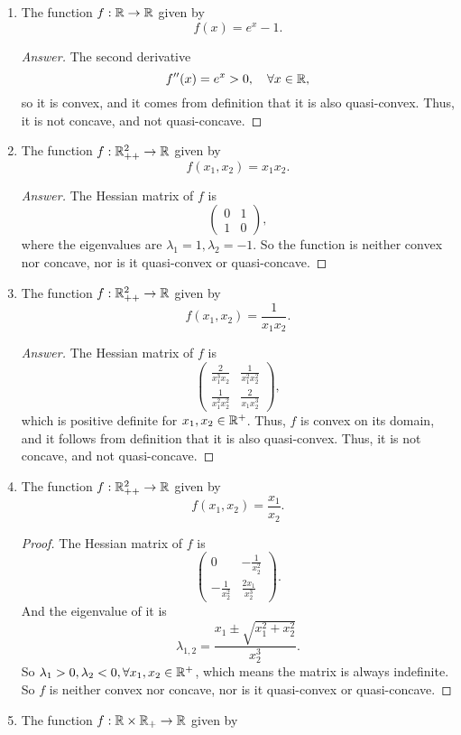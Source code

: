 \begin{enumerate}
	\item The function \(f: \mathbb{R} \to \mathbb{R}\) given by
	\[ f(x)=e^x-1. \]
	\begin{proof}[Answer]
	The second derivative
	\[ f''(x)=e^x>0,\quad \forall x\in\mathbb{R}, \]
	so it is convex, and it comes from definition that it is also quasi-convex.
	Thus, it is not concave, and not quasi-concave.
	\end{proof}
	\item The function \(f: \mathbb{R}_{++}^2 \to \mathbb{R}\) given by
	\[ f(x_1,x_2)=x_1 x_2. \]
	\begin{proof}[Answer]
	The Hessian matrix of \(f\) is
	\[ \begin{pmatrix} 0 & 1 \\ 1 & 0 \end{pmatrix}, \]
	where the eigenvalues are \(\lambda_1=1,\lambda_2=-1\).
	So the function is neither convex nor concave, nor is it quasi-convex or quasi-concave.
	\end{proof}
	\item The function \(f: \mathbb{R}_{++}^2 \to \mathbb{R}\) given by
	\[ f(x_1,x_2)=\frac{1}{x_1 x_2}. \]
	\begin{proof}[Answer]
	The Hessian matrix of \(f\) is
	\[ \begin{pmatrix} \frac{2}{x_1^3 x_2} & \frac{1}{x_1^2 x_2^2} \\ \frac{1}{x_1^2 x_2^2} & \frac{2}{x_1 x_2^3} \end{pmatrix}, \]
	which is positive definite for \(x_1,x_2\in\mathbb{R}^{+}\).
	Thus, \(f\) is convex on its domain, and it follows from definition that it is also quasi-convex.
	Thus, it is not concave, and not quasi-concave.
	\end{proof}
	\item The function \(f: \mathbb{R}_{++}^2 \to \mathbb{R}\) given by
	\[ f(x_1,x_2)=\frac{x_1}{x_2}. \]
	\begin{proof}
	The Hessian matrix of \(f\) is
	\[ \begin{pmatrix} 0 & -\frac{1}{x_2^2} \\ -\frac{1}{x_2^2} & \frac{2x_1}{x_2^3} \end{pmatrix}. \]
	And the eigenvalue of it is
	\[ \lambda_{1,2}=\frac{x_1\pm\sqrt{x_1^2+x_2^2}}{x_2^3}. \]
	So \(\lambda_1>0,\lambda_2<0,\forall x_1,x_2\in\mathbb{R}^+\), which means the matrix is always indefinite.
	So \(f\) is neither convex nor concave, nor is it quasi-convex or quasi-concave.
	\end{proof}
	\item The function \(f: \mathbb{R}\times\mathbb{R}_+ \to \mathbb{R}\) given by

\end{enumerate}
